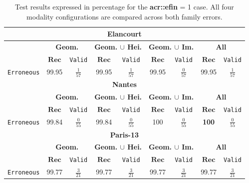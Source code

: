         \begin{table}
            \renewcommand{\arraystretch}{1.5}
            \begin{tabular}{|c | c c | c c | c c | c c |}
                \hline
                \multicolumn{9}{|c|}{\textbf{Elancourt}}\\
                \hline
                &\multicolumn{2}{c|}{\textbf{Geom.}} & \multicolumn{2}{c|}{\textbf{Geom. $\cup$ Hei.}} & \multicolumn{2}{c|}{\textbf{Geom. $\cup$ Im.}} & \multicolumn{2}{x{2.4cm}|}{\textbf{All}}\\
                \cline{2-9}
                & $\bm{Rec}$ & \texttt{Valid} &  $\bm{Rec}$ & \texttt{Valid} &  $\bm{Rec}$ & \texttt{Valid} &  $\bm{Rec}$ & \texttt{Valid} \\
                \hline
                \texttt{Erroneous} & 99.95 & $\frac{1}{57}$ & 99.95 & $\frac{1}{57}$ & 99.95 & $\frac{0}{57}$ & 99.95 & $\frac{1}{57}$ \\
                \hline
                \hline
                \multicolumn{9}{|c|}{\textbf{Nantes}}\\
                \hline
                &\multicolumn{2}{c|}{\textbf{Geom.}} & \multicolumn{2}{c|}{\textbf{Geom. $\cup$ Hei.}} & \multicolumn{2}{c|}{\textbf{Geom. $\cup$ Im.}} & \multicolumn{2}{x{2.4cm}|}{\textbf{All}}\\
                \cline{2-9}
                & $\bm{Rec}$ & \texttt{Valid} &  $\bm{Rec}$ & \texttt{Valid} &  $\bm{Rec}$ & \texttt{Valid} &  $\bm{Rec}$ & \texttt{Valid} \\
                \hline
                \texttt{Erroneous} & 99.84 & $\frac{0}{55}$ & 99.84 & $\frac{0}{55}$ & 100 & $\frac{0}{55}$ & \textbf{100} & $\frac{0}{55}$ \\
                \hline
                \hline
                \multicolumn{9}{|c|}{\textbf{Paris-13}}\\
                \hline
                &\multicolumn{2}{c|}{\textbf{Geom.}} & \multicolumn{2}{c|}{\textbf{Geom. $\cup$ Hei.}} & \multicolumn{2}{c|}{\textbf{Geom. $\cup$ Im.}} & \multicolumn{2}{x{2.4cm}|}{\textbf{All}}\\
                \cline{2-9}
                & $\bm{Rec}$ & \texttt{Valid} &  $\bm{Rec}$ & \texttt{Valid} &  $\bm{Rec}$ & \texttt{Valid} &  $\bm{Rec}$ & \texttt{Valid} \\
                \hline
                \texttt{Erroneous} & 99.77 & $\frac{3}{21}$ & 99.77 & $\frac{3}{21}$ & 99.77 & $\frac{3}{21}$ & 99.77 & $\frac{3}{21}$ \\
                \hline
            \end{tabular}
            \renewcommand{\arraystretch}{1}
            \caption{
                \label{tab::ablation_f1}
                Test results expressed in percentage for the \textbf{\gls{acr::efin}} = 1 case.
                All four modality configurations are compared across both family errors.
            }
        \end{table}
        
